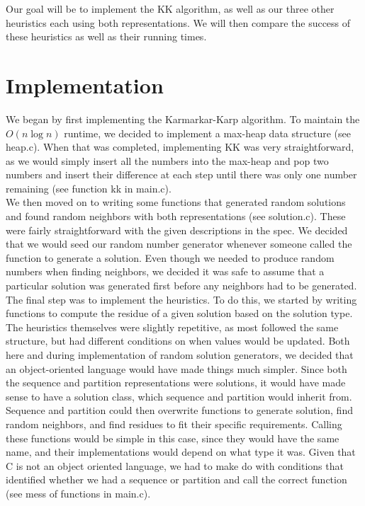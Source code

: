 \documentclass[12pt]{article}
\begin{document}
Our goal will be to implement the KK algorithm, as well as our three other heuristics each using both representations. We will then compare the success of these heuristics as well as their running times.

\section{Implementation}
We began by first implementing the Karmarkar-Karp algorithm. To maintain the $O(n \log n)$ runtime, we decided to implement a max-heap data structure (see heap.c). When that was completed, implementing KK was very straightforward, as we would simply insert all the numbers into the max-heap and pop two numbers and insert their difference at each step until there was only one number remaining (see function kk in main.c). \\

We then moved on to writing some functions that generated random solutions and found random neighbors with both representations (see solution.c). These were fairly straightforward with the given descriptions in the spec. We decided that we would seed our random number generator whenever someone called the function to generate a solution. Even though we needed to produce random numbers when finding neighbors, we decided it was safe to assume that a particular solution was generated first before any neighbors had to be generated. \\

The final step was to implement the heuristics. To do this, we started by writing functions to compute the residue of a given solution based on the solution type. The heuristics themselves were slightly repetitive, as most followed the same structure, but had different conditions on when values would be updated. Both here and during implementation of random solution generators, we decided that an object-oriented language would have made things much simpler. Since both the sequence and partition representations were solutions, it would have made sense to have a solution class, which sequence and partition would inherit from. Sequence and partition could then overwrite functions to generate solution, find random neighbors, and find residues to fit their specific requirements. Calling these functions would be simple in this case, since they would have the same name, and their implementations would depend on what type it was. Given that C is not an object oriented language, we had to make do with conditions that identified whether we had a sequence or partition and call the correct function (see mess of functions in main.c). \\
\end{document}
